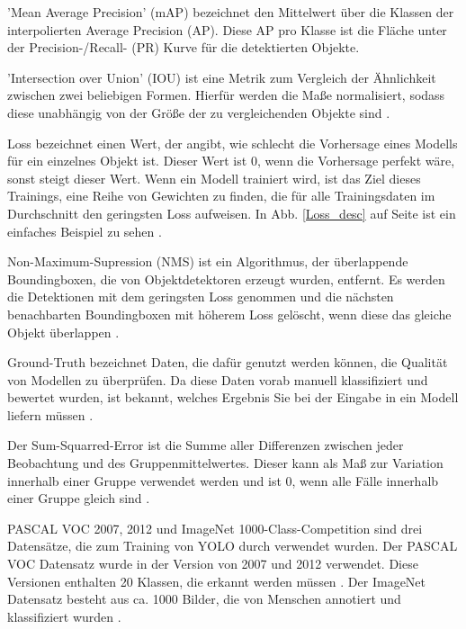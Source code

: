 {{	'Mean Average Precision' (mAP) bezeichnet den Mittelwert über die Klassen der interpolierten Average Precision (AP). Diese AP pro Klasse ist die Fläche unter der Precision-/Recall- (PR) Kurve für die detektierten Objekte. %
	
	'Intersection over Union' (IOU) ist eine Metrik zum Vergleich der Ähnlichkeit zwischen zwei beliebigen Formen. Hierfür werden die Maße normalisiert, sodass diese unabhängig von der Größe der zu vergleichenden Objekte sind \citep{Rezatofighi2019}. 

	Loss bezeichnet einen Wert, der angibt, wie schlecht die Vorhersage eines Modells für ein einzelnes Objekt ist. Dieser Wert ist 0, wenn die Vorhersage perfekt wäre, sonst steigt dieser Wert. Wenn ein Modell trainiert wird, ist das Ziel dieses Trainings, eine Reihe von Gewichten zu finden, die für alle Trainingsdaten im Durchschnitt den geringsten Loss aufweisen. In Abb. \ref{Loss_desc} auf Seite \pageref{Loss_desc} ist ein einfaches Beispiel zu sehen \citep{loss_google}. 

	Non-Maximum-Supression (NMS) ist ein Algorithmus, der überlappende Boundingboxen, die von Objektdetektoren erzeugt wurden, entfernt. Es werden die Detektionen mit dem geringsten Loss genommen und die nächsten benachbarten Boundingboxen mit höherem Loss gelöscht, wenn diese das gleiche Objekt überlappen \citep{Hosang2017}. 

	Ground-Truth bezeichnet Daten, die dafür genutzt werden können, die Qualität von Modellen zu überprüfen. Da diese Daten vorab manuell klassifiziert und bewertet wurden, ist bekannt, welches Ergebnis Sie bei der Eingabe in ein Modell liefern müssen \citep{Ground_truth_desc}.

	Der Sum-Squarred-Error ist die Summe aller Differenzen zwischen jeder Beobachtung und des Gruppenmittelwertes. Dieser kann als Maß zur Variation innerhalb einer Gruppe verwendet werden und ist 0, wenn alle Fälle innerhalb einer Gruppe gleich sind \citep{SOSQE_desc}.

	PASCAL VOC 2007, 2012 und ImageNet 1000-Class-Competition \citep{Russakovsky2015} sind drei Datensätze, die zum Training von YOLO durch \citeauthor{Redmon2016} verwendet wurden. Der PASCAL VOC Datensatz wurde in der Version von 2007 und 2012 verwendet. Diese Versionen enthalten 20 Klassen, die erkannt werden müssen  \citep{pascal_voc}.  Der ImageNet Datensatz besteht aus ca. 1000 Bilder, die von Menschen annotiert und klassifiziert wurden \citep{imageNET_about}.
	}
}

